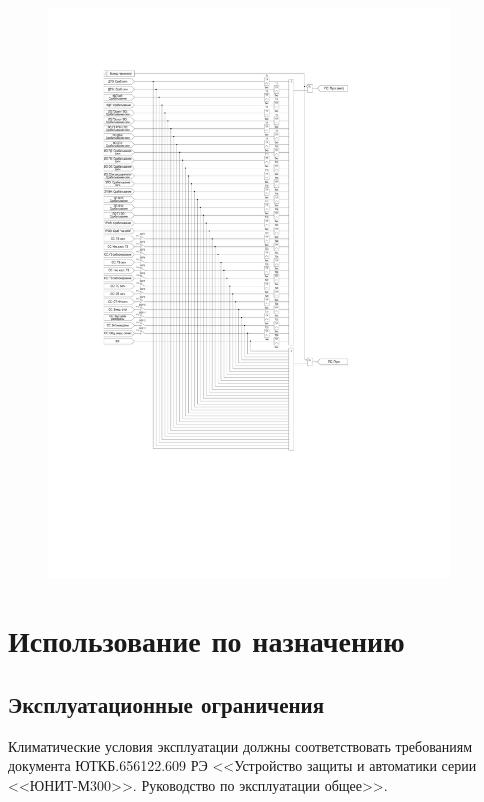 \documentclass[a4paper, 12pt,table, hidelinks, DIV=calc]{extarticle} %
\begin{document}
\begin{enumerate}[label=\arabic{section}.\arabic{subsection}.\arabic*, labelsep=4pt, leftmargin=0pt, itemindent=57pt]
\begin{figure}[!h]
\centering
\includegraphics[width=0.95\textwidth,height=0.95\textheight,keepaspectratio]{img38.pdf}
\label{ps:img1}
\end{figure}

\end{enumerate}
\FloatBarrier %
\newpage
\color{uniblue}\section[Использование по назначению]{Использование по назначению}\label{sec:using}
\color{black}

\color{uniblue}\subsection{Эксплуатационные ограничения}\color{black}
Климатические условия эксплуатации должны соответствовать требованиям документа ЮТКБ.656122.609 РЭ <<Устройство защиты и автоматики серии <<ЮНИТ-М300>>. Руководство по эксплуатации общее>>.
\end{document}
